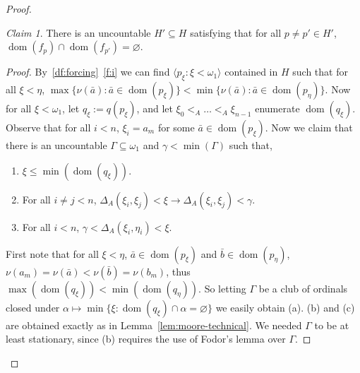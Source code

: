 \documentclass[10pt]{amsart}
\theoremstyle{definition}
\theoremstyle{remark}
\newtheorem{claim}[theorem]{Claim}
\newcommand{\es}{\varnothing}
\newcommand{\seb}{\subseteq}
\newcommand{\tup}[1]{\langle#1\rangle}
\newcommand{\ra}{\rightarrow}
\newcommand{\ba}{\bar{a}}
\newcommand{\bb}{\bar{b}}
\newcommand{\1}{\mathbbm{1}}
\DeclareMathOperator{\dom}{dom}
\begin{document}
\begin{proof}
  \begin{claim}
    There is an uncountable $H' \seb H$ satisfying that
    for all $p \neq p' \in H'$, $\dom(f_{p}) \cap \dom(f_{p'}) = \es$.
  \end{claim}
  \begin{proof}
    By~\ref{df:forcing}~\ref{f:i} we can find
    $\tup{p_{\xi} : \xi < \omega_{1}}$ contained in $H$
    such that for all $\xi < \eta$,
    $\max\{\nu(\ba) : \ba \in \dom(p_{\xi})\} < \min\{\nu(\ba) : \ba \in \dom(p_{\eta})\}$.
    Now for all $\xi < \omega_{1}$, let $q_{\xi} := q(p_{\xi})$, and
    let $\xi_{0} <_{A} \dots <_{A} \xi_{n-1}$ enumerate $\dom(q_{\xi})$. Observe
    that for all $i < n$, $\xi_{i} = a_{m}$ for some
    $\ba \in \dom(p_{\xi})$. Now we claim that there is an uncountable
    $\Gamma \seb \omega_{1}$ and $\gamma < \min(\Gamma)$ such that,
    \begin{enumerate}[label = (\alph*)]\itemsep0em
      \item $\xi \le \min(\dom(q_{\xi}))$.
      \item For all $i \neq j < n$, $\Delta_{A}(\xi_{i},\xi_{j}) < \xi
      \ra \Delta_{A}(\xi_{i},\xi_{j}) < \gamma$.
      \item For all $i < n$, $\gamma < \Delta_{A}(\xi_{i},\eta_{i}) < \xi$.
    \end{enumerate}
    First note that for all $\xi < \eta$,
    $\ba \in \dom(p_{\xi})$ and $\bb \in \dom(p_{\eta})$,
    $\nu(a_{m}) = \nu(\ba) < \nu(\bb) = \nu(b_{m})$,
    thus $\max(\dom(q_{\xi})) < \min(\dom(q_{\eta}))$. So letting
    $\Gamma$ be a club of ordinals closed under
    $\alpha \mapsto \min\{\xi : \dom(q_{\xi}) \cap \alpha = \es\}$ we easily
    obtain (a).
    (b) and (c) are obtained exactly as in Lemma~\ref{lem:moore-technical}. We
    needed $\Gamma$ to be at least stationary, since (b) requires the use of Fodor's lemma
    over $\Gamma$.


\end{proof}
\end{proof}
\end{document}
